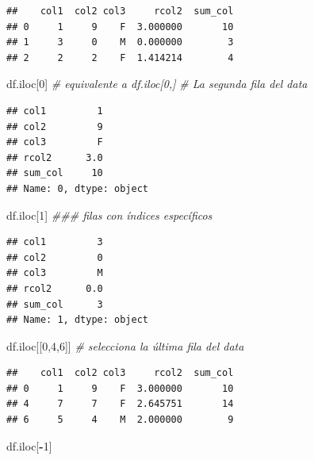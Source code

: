 \documentclass[
]{book}
\newenvironment{Shaded}{\begin{snugshade}}{\end{snugshade}}
\newcommand{\CommentTok}[1]{\textcolor[rgb]{0.56,0.35,0.01}{\textit{#1}}}
\newcommand{\DecValTok}[1]{\textcolor[rgb]{0.00,0.00,0.81}{#1}}
\newcommand{\NormalTok}[1]{#1}
\newcommand{\OperatorTok}[1]{\textcolor[rgb]{0.81,0.36,0.00}{\textbf{#1}}}
\theoremstyle{definition}
\theoremstyle{definition}
\theoremstyle{definition}
\theoremstyle{definition}
\theoremstyle{remark}
\begin{document}
\begin{verbatim}
##    col1  col2 col3     rcol2  sum_col
## 0     1     9    F  3.000000       10
## 1     3     0    M  0.000000        3
## 2     2     2    F  1.414214        4
\end{verbatim}

\begin{Shaded}
\begin{Highlighting}[]
\NormalTok{df.iloc[}\DecValTok{0}\NormalTok{] }\CommentTok{\# equivalente a df.iloc[0,] }
\CommentTok{\# La segunda fila del data }
\end{Highlighting}
\end{Shaded}

\begin{verbatim}
## col1         1
## col2         9
## col3         F
## rcol2      3.0
## sum_col     10
## Name: 0, dtype: object
\end{verbatim}

\begin{Shaded}
\begin{Highlighting}[]
\NormalTok{df.iloc[}\DecValTok{1}\NormalTok{] }
\CommentTok{\#\#\# filas con índices específicos }
\end{Highlighting}
\end{Shaded}

\begin{verbatim}
## col1         3
## col2         0
## col3         M
## rcol2      0.0
## sum_col      3
## Name: 1, dtype: object
\end{verbatim}

\begin{Shaded}
\begin{Highlighting}[]
\NormalTok{df.iloc[[}\DecValTok{0}\NormalTok{,}\DecValTok{4}\NormalTok{,}\DecValTok{6}\NormalTok{]]}
\CommentTok{\# selecciona la última fila del data}
\end{Highlighting}
\end{Shaded}

\begin{verbatim}
##    col1  col2 col3     rcol2  sum_col
## 0     1     9    F  3.000000       10
## 4     7     7    F  2.645751       14
## 6     5     4    M  2.000000        9
\end{verbatim}

\begin{Shaded}
\begin{Highlighting}[]
\NormalTok{df.iloc[}\OperatorTok{{-}}\DecValTok{1}\NormalTok{] }
\end{Highlighting}
\end{Shaded}
\end{document}

